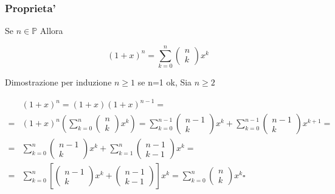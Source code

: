 \documentclass{article}
\begin{document}
      \subsubsection{Proprieta'}
      \begin{flushleft}
        Se $n \in \mathbb{P}$ Allora
      \end{flushleft}
      \begin{equation}
        (1+x)^n=\sum_{k=0}^n \begin{pmatrix}
          n \\
          k
        \end{pmatrix} x^k
      \end{equation}
      \begin{flushleft}
        Dimostrazione per induzione $n \geq 1$ se n=1 ok, Sia $n \geq 2$
      \end{flushleft}
        \begin{equation}
          \begin{split}
            & (1+x)^n=(1+x)(1+x)^{n-1}= \\
             = & (1+x)^n(\sum_{k=0}^n \begin{pmatrix}
              n \\
              k
             \end{pmatrix} x^k)=
             \sum_{k=0}^{n-1} \begin{pmatrix}
              n-1 \\
              k
             \end{pmatrix} x^k+
             \sum_{k=0}^{n-1} \begin{pmatrix}
              n-1 \\
              k
             \end{pmatrix} x^{k+1}=\\
             = & 
             \sum_{k=0}^{n} \begin{pmatrix}
              n-1 \\
              k
             \end{pmatrix} x^k+
             \sum_{k=1}^{n} \begin{pmatrix}
              n-1 \\
              k-1
             \end{pmatrix} x^{k}=\\
             = & \sum_{k=0}^n[\begin{pmatrix}
              n-1 \\ 
               k
             \end{pmatrix}x^k+\begin{pmatrix}
              n-1 \\ 
               k-1
             \end{pmatrix}] x^k= \sum_{k=0}^n \begin{pmatrix}
               n \\ 
               k
             \end{pmatrix}x^k \square
          \end{split}
        \end{equation}
\end{document}
